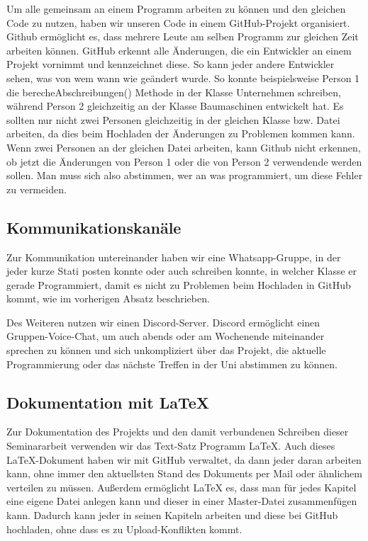 Um alle gemeinsam an einem Programm arbeiten zu können und den gleichen Code zu nutzen, haben wir unseren Code in einem GitHub-Projekt organisiert. Github ermöglicht es, dass mehrere Leute am selben Programm zur gleichen Zeit arbeiten können. GitHub erkennt alle Änderungen, die ein Entwickler an einem Projekt vornimmt und kennzeichnet diese. So kann jeder andere Entwickler sehen, was von wem wann wie geändert wurde. So konnte beispielsweise Person 1 die berecheAbschreibungen() Methode in der Klasse Unternehmen schreiben, während Person 2 gleichzeitig an der Klasse Baumaschinen entwickelt hat. Es sollten nur nicht zwei Personen gleichzeitig in der gleichen Klasse bzw. Datei arbeiten, da dies beim Hochladen der Änderungen zu Problemen kommen kann. Wenn zwei Personen an der gleichen Datei arbeiten, kann Github nicht erkennen, ob jetzt die Änderungen von Person 1 oder die von Person 2 verwendende werden sollen. Man muss sich also abstimmen, wer an was programmiert, um diese Fehler zu vermeiden.



\subsection{Kommunikationskanäle}

Zur Kommunikation untereinander haben wir eine Whatsapp-Gruppe, in der jeder kurze Stati posten konnte oder auch schreiben konnte, in welcher Klasse er gerade Programmiert, damit es nicht zu Problemen beim Hochladen in GitHub kommt, wie im vorherigen Absatz beschrieben.

Des Weiteren nutzen wir einen Discord-Server. Discord ermöglicht einen Gruppen-Voice-Chat, um auch abends oder am Wochenende miteinander sprechen zu können und sich unkompliziert über das Projekt, die aktuelle Programmierung oder das nächste Treffen in der Uni abstimmen zu können.


\subsection{Dokumentation mit LaTeX}

Zur Dokumentation des Projekts und den damit verbundenen Schreiben dieser Seminararbeit verwenden wir das Text-Satz Programm LaTeX. Auch dieses LaTeX-Dokument haben wir mit GitHub verwaltet, da dann jeder daran arbeiten kann, ohne immer den aktuellsten Stand des Dokuments per Mail oder ähnlichem verteilen zu müssen. Außerdem ermöglicht LaTeX es, dass man für jedes Kapitel eine eigene Datei anlegen kann und dieser in einer Master-Datei zusammenfügen kann. Dadurch kann jeder in seinen Kapiteln  arbeiten und diese bei GitHub hochladen, ohne dass es zu Upload-Konflikten kommt.